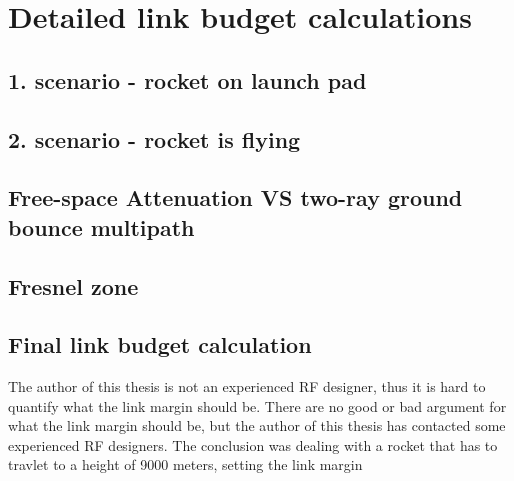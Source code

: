 \chapter{Detailed link budget calculations}

\section{1. scenario - rocket on launch pad}

\section{2. scenario - rocket is flying}

\section{Free-space Attenuation VS two-ray ground bounce multipath}

\section{Fresnel zone}

\section{Final link budget calculation}

The author of this thesis is not an experienced RF designer, thus it is hard to quantify what the link margin should be. There are no good or bad argument for what the link margin should be, but the author of this thesis has contacted some experienced RF designers. The conclusion was dealing with a rocket that has to travlet to a height of 9000 meters, setting the link margin    

